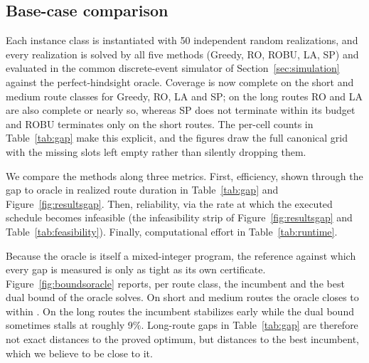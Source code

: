 %
%
%

\subsection{Base-case comparison}
\label{sec:basecase}

Each instance class is instantiated with 50 independent random realizations,
and every realization is solved by all five methods (Greedy, RO, ROBU, LA, SP)
and evaluated in the common discrete-event simulator of
Section~\ref{sec:simulation} against the perfect-hindsight oracle.  Coverage is
now complete on the short and medium route classes for Greedy, RO, LA and SP;
on the long routes RO and LA are also complete or nearly so, whereas SP does
not terminate within its budget and ROBU terminates only on the short routes.
The per-cell counts in Table~\ref{tab:gap} make this explicit, and the figures
draw the full canonical grid with the missing slots left empty rather than
silently dropping them.

We compare the methods along three metrics.  First, efficiency, shown through
the gap to oracle in realized route duration in Table~\ref{tab:gap} and
Figure~\ref{fig:resultsgap}.  Then, reliability, via the rate at which the
executed schedule becomes infeasible (the infeasibility strip of
Figure~\ref{fig:resultsgap} and Table~\ref{tab:feasibility}).  Finally,
computational effort in Table~\ref{tab:runtime}.

Because the oracle is itself a mixed-integer program, the reference against
which every gap is measured is only as tight as its own certificate.
Figure~\ref{fig:boundsoracle} reports, per route class, the incumbent and the
best dual bound of the oracle solves.  On short and medium routes the oracle
closes to within .  On the long routes the incumbent stabilizes early
while the dual bound sometimes stalls at roughly 9\%.  Long-route gaps in
Table~\ref{tab:gap} are therefore not exact distances to the proved optimum,
but distances to the best incumbent, which we believe to be close to it.

